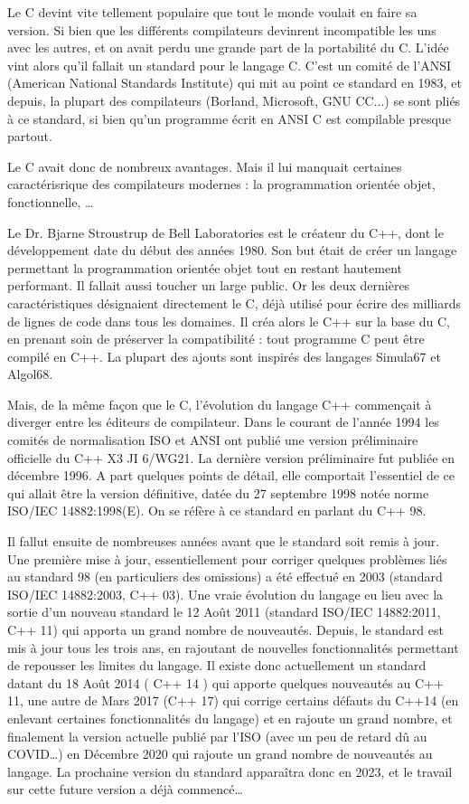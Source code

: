 Le C devint vite tellement populaire que tout le monde voulait en faire sa version. Si bien que les différents compilateurs devinrent incompatible les uns avec les autres, et on avait perdu une grande part de la portabilité du C. L'idée vint alors qu'il fallait un standard pour le langage C. C'est un comité de l'ANSI (American National Standards Institute) qui mit au point ce standard en 1983, et depuis, la plupart des compilateurs (Borland, Microsoft, GNU CC...) se sont pliés à ce standard, si bien qu'un programme écrit en ANSI C est compilable presque partout.

Le C avait donc de nombreux avantages. Mais il lui manquait certaines caractérisrique des compilateurs modernes : la programmation orientée objet, fonctionnelle, \ldots

Le Dr. Bjarne Stroustrup de Bell Laboratories est le créateur du C++, dont le développement date du début des années 1980. Son but était de créer un langage permettant la programmation orientée objet tout en restant hautement performant. Il fallait aussi toucher un large public. Or les deux dernières caractéristiques désignaient directement le C, déjà utilisé pour écrire des milliards de lignes de code dans tous les domaines. Il créa alors le C++ sur la base du C, en prenant soin de préserver la compatibilité : tout programme C peut être compilé en C++. La plupart des ajouts sont inspirés des langages Simula67 et Algol68. 

Mais, de la même façon que le C, l'évolution du langage C++ commençait à diverger entre les éditeurs de compilateur. Dans le courant de l'année 1994 les comités de normalisation ISO et ANSI ont publié une version préliminaire officielle du C++ X3 JI 6/WG21. La dernière version préliminaire fut publiée en décembre 1996. A part quelques points de détail, elle comportait l'essentiel de ce qui allait être la version définitive, datée du 27 septembre 1998 notée norme ISO/IEC 14882:1998(E). On se réfère à ce standard en parlant du C++ 98.

Il fallut ensuite de nombreuses années avant que le standard soit remis à jour. Une première mise à jour, essentiellement pour
corriger quelques problèmes liés au standard 98 (en particuliers des omissions) a été effectué en 2003 (standard ISO/IEC 14882:2003, C++ 03). Une vraie évolution du langage eu lieu avec la sortie d'un nouveau standard le 12 Août 2011 (standard ISO/IEC 14882:2011, C++ 11) qui apporta un grand nombre de nouveautés. Depuis, le standard est mis à jour tous les trois ans, en rajoutant de nouvelles fonctionnalités permettant de repousser les limites du langage. Il existe donc actuellement un standard datant du 18 Août 2014 ( C++ 14 ) qui apporte quelques nouveautés au C++ 11, une autre de Mars 2017 (C++ 17) qui corrige certains défauts du C++14 (en enlevant certaines fonctionnalités du langage) et en rajoute un grand nombre, et finalement la version actuelle publié par l'ISO (avec un peu de retard dû au COVID\ldots) en Décembre 2020 qui rajoute un grand nombre de nouveautés au langage. La prochaine version du standard apparaîtra donc en 2023, et le travail sur cette future version a déjà commencé\ldots


